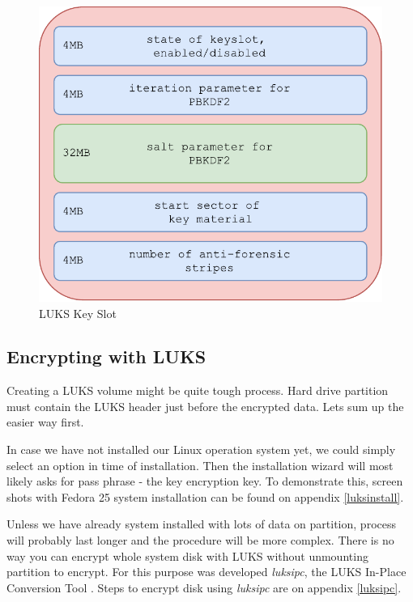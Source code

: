 \documentclass[../xdudla00-porting-Tang-to-Open-WRT.tex]{subfiles}
\begin{document}
\begin{figure}[h]
    \centering
    \includegraphics[scale=0.6]{figures/LUKSkeyslot.pdf}
    \caption{LUKS Key Slot}
    \label{fig:luksslot}
\end{figure}

\subsection{Encrypting with LUKS}

Creating a LUKS volume might be quite tough process. 
Hard drive partition must contain the LUKS header just before the encrypted data.
Lets sum up the easier way first.

In case we have not installed our Linux operation system yet, we could simply select an option in time of installation.
Then the installation wizard will most likely asks for pass phrase - the key encryption key.
To demonstrate this, screen shots with Fedora 25 system installation can be found on appendix \ref{luksinstall}.

Unless we have already system installed with lots of data on partition, process will probably last longer and the procedure will be more complex. 
There is no way you can encrypt whole system disk with LUKS without unmounting partition to encrypt.
For this purpose was developed {\it luksipc}, the LUKS In-Place Conversion Tool \cite{luksipc}.
Steps to encrypt disk using {\it luksipc} are on appendix \ref{luksipc}.
\end{document}
